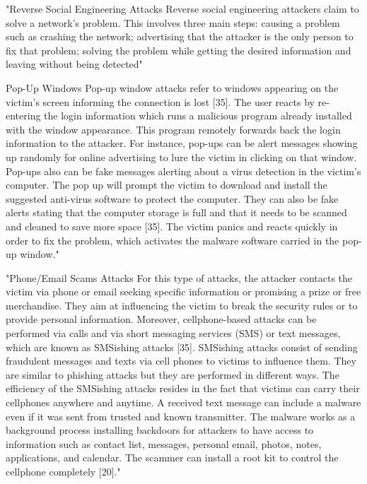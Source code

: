 "Reverse Social Engineering Attacks
Reverse social engineering attackers claim to solve a network’s problem. This involves three main steps: causing a problem such as crashing the network;
advertising that the attacker is the only person to fix that problem; solving the problem while getting the desired information and leaving without being detected"\cite{4_mdpi}

Pop-Up Windows
Pop-up window attacks refer to windows appearing on the victim’s screen informing the connection is lost [35]. The user reacts by re-entering the login information
 which runs a malicious program already installed with the window appearance. This program remotely forwards back the login information to the attacker. For instance,
 pop-ups can be alert messages showing up randomly for online advertising to lure the victim in clicking on that window. Pop-ups also can be fake messages alerting about
 a virus detection in the victim’s computer. The pop up will prompt the victim to download and install the suggested anti-virus software to protect the computer. They can
 also be fake alerts stating that the computer storage is full and that it needs to be scanned and cleaned to save more space [35]. The victim panics and reacts quickly in
 order to fix the problem, which activates the malware software carried in the pop-up window."\cite{4_mdpi}

"Phone/Email Scams Attacks
For this type of attacks, the attacker contacts the victim via phone or email seeking specific information or promising a prize or free merchandise.
They aim at influencing the victim to break the security rules or to provide personal information. Moreover, cellphone-based attacks can be performed
via calls and via short messaging services (SMS) or text messages, which are known as SMSishing attacks [35]. SMSishing attacks consist of sending fraudulent
messages and texts via cell phones to victims to influence them. They are similar to phishing attacks but they are performed in different ways. The efficiency of
the SMSishing attacks resides in the fact that victims can carry their cellphones anywhere and anytime. A received text message can include a malware even if it was
sent from trusted and known transmitter. The malware works as a background process installing backdoors for attackers to have access to information such as contact list,
messages, personal email, photos, notes, applications, and calendar. The scammer can install a root kit to control the cellphone completely [20]."\cite{4_mdpi}

